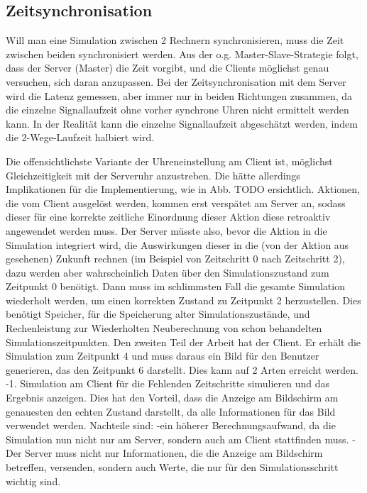 \subsection{Zeitsynchronisation}

Will man eine Simulation zwischen 2 Rechnern synchronisieren, muss die Zeit zwischen beiden synchronisiert werden. Aus der o.g. Master-Slave-Strategie folgt, dass der Server (Master) die Zeit vorgibt, und die Clients möglichst genau versuchen, sich daran anzupassen. Bei der Zeitsynchronisation mit dem Server wird die Latenz gemessen, aber immer nur in beiden Richtungen zusammen, da die einzelne Signallaufzeit ohne vorher synchrone Uhren nicht ermittelt werden kann. In der Realität kann die einzelne Signallaufzeit abgeschätzt werden, indem die 2-Wege-Laufzeit halbiert wird.

Die offensichtlichste Variante der Uhreneinstellung am Client ist, möglichst Gleichzeitigkeit mit der Serveruhr anzustreben. Die hätte allerdings Implikationen für die Implementierung, wie in Abb. TODO ersichtlich. Aktionen, die vom Client ausgelöst werden, kommen erst verspätet am Server an, sodass dieser für eine korrekte zeitliche Einordnung dieser Aktion diese retroaktiv angewendet werden muss. Der Server müsste also, bevor die Aktion in die Simulation integriert wird, die Auswirkungen dieser in die (von der Aktion aus gesehenen) Zukunft rechnen (im Beispiel von Zeitschritt 0 nach Zeitschritt 2), dazu werden aber wahrscheinlich Daten über den Simulationszustand zum Zeitpunkt 0 benötigt. Dann muss im schlimmsten Fall die gesamte Simulation wiederholt werden, um einen korrekten Zustand zu Zeitpunkt 2 herzustellen. Dies benötigt Speicher, für die Speicherung alter Simulationszustände, und Rechenleistung zur Wiederholten Neuberechnung von schon behandelten Simulationszeitpunkten. Den zweiten Teil der Arbeit hat der Client. Er erhält die Simulation zum Zeitpunkt 4 und muss daraus ein Bild für den Benutzer generieren, das den Zeitpunkt 6 darstellt. Dies kann auf 2 Arten erreicht werden.
-1. Simulation am Client für die Fehlenden Zeitschritte simulieren und das Ergebnis anzeigen. Dies hat den Vorteil, dass die Anzeige am Bildschirm am genauesten den echten Zustand darstellt, da alle Informationen für das Bild verwendet werden. Nachteile sind: 
 -ein höherer Berechnungsaufwand, da die Simulation nun nicht nur am Server, sondern auch am Client stattfinden muss. 
 -Der Server muss nicht nur Informationen, die die Anzeige am Bildschirm betreffen, versenden, sondern auch Werte, die nur für den Simulationsschritt wichtig sind.
